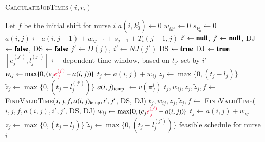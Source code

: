 \documentclass[a4paper,11pt,authoryear]{elsarticle}
\begin{document}
\begin{algorithm}[htbp!]
\caption{\textsc{CalculateJobTimes}$(i, r_i)$}
\label{alg:cjt}
\begin{algorithmic}[1]
	\State Let $f$ be the initial shift for nurse $i$
	\State $a(i,k_{0}^i) \gets 0$
	\State $w_{ik_{0}^i} \gets 0$
	\State $s_{k_{0}^i} \gets 0$
		\State $a(i,j) \gets a(i, j-1) + w_{ij-1} + s_{j-1} + T_i(j-1, j)$
		\State $i' \gets \textbf{null}$, $j' \gets \textbf{null}$, DJ $\gets \textbf{false}$, DS $\gets \textbf{false}$ %
			\State $j' \gets D(j)$, $i' \gets NJ(j')$
					\State DS $\gets \textbf{true}$
				\Else \hspace{0.2mm} DJ $\gets \textbf{true}$
				\EndIf
				\State $[e_j^{(j')}, l_j^{(j')}] \gets$ dependent time window, based on $t_{j'}$ set by $i'$
			\EndIf
		\EndIf %
			\State $w_{ij} \gets \max\{0, (e_j \chng{e_j^{(j')}} - a(i,j))\}$
			\State $t_j \gets a(i,j) + w_{ij}$
			\State $z_j \gets \max\{0, (t_j - l_j)\}$
				\State $\tilde{z}_j \gets \max\{0, (t_j - l_j^{(j')})\}$
			\EndIf
			\State $a(i,j)_{\textup{temp}}$ $\gets v(\pi_{f}^{i})$
			\State $t_j, w_{ij}, z_j, \tilde{z}_j, f \gets$ \textsc{FindValidTime}($i, j, f, a(i,j)_{\textup{temp}}, i', j'$, DS, DJ)
			\State $t_j, w_{ij}, z_j, \tilde{z}_j, f \gets$ \textsc{FindValidTime}($i, j, f, a(i,j), i', j'$, DS, DJ)
		\Else
			\State $w_{ij} \gets \max\{0, (e_j \chng{e_j^{(j')}} - a(i,j))\}$
			\State $t_j \gets a(i,j) + w_{ij}$
			\State $z_j \gets \max\{0, (t_j - l_j)\}$
				\State $\tilde{z}_j \gets \max\{0, (t_j - l_j^{(j')})\}$
			\EndIf
		\EndIf
	\EndFor
	\Return feasible schedule for nurse $i$
\end{algorithmic}
\end{algorithm}
\end{document}
